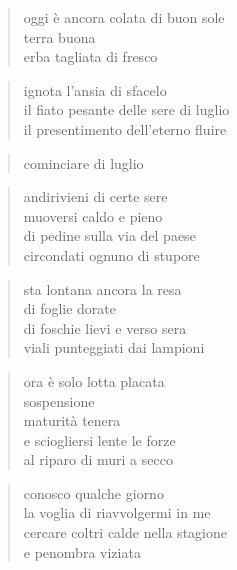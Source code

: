 \begin{verse}
    oggi è ancora colata di buon sole\\
    terra buona\\
    erba tagliata di fresco
\end{verse}

\begin{verse}
    ignota l'ansia di sfacelo\\
    il fiato pesante delle sere di luglio\\
    il presentimento dell'eterno fluire
\end{verse}

\clearpage


\begin{verse}
    cominciare di luglio
\end{verse}

\begin{verse}
    andirivieni di certe sere\\
    muoversi caldo e pieno\\
    di pedine sulla via del paese\\
    circondati ognuno di stupore
\end{verse}

\begin{verse}
    sta lontana ancora la resa\\
    di foglie dorate\\
    di foschie lievi e verso sera\\
    viali punteggiati dai lampioni
\end{verse}

\begin{verse}
    ora è solo lotta placata\\
    sospensione\\
    maturità tenera\\
    e sciogliersi lente le forze\\
    al riparo di muri a secco
\end{verse}

\clearpage


\begin{verse}
    conosco qualche giorno\\
    la voglia di riavvolgermi in me\\
    cercare coltri calde nella stagione\\
    e penombra viziata
\end{verse}

